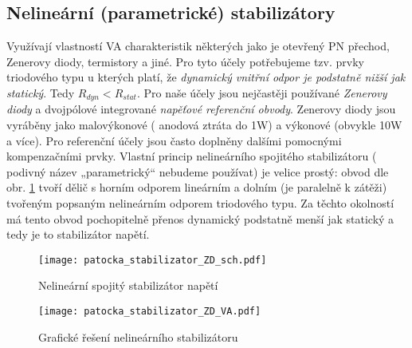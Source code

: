     \subsection{Nelineární (parametrické) stabilizátory}
      Využívají vlastností VA charakteristik některých jako je otevřený PN přechod, Zenerovy diody, termistory a jiné. Pro tyto účely potřebujeme tzv. prvky triodového typu u kterých platí, že \emph{dynamický vnitřní odpor je podstatně nižší jak statický}. Tedy $R_{dyn} < R_{stat}$. Pro naše účely jsou nejčastěji používané \emph{Zenerovy diody} a dvojpólové integrované \emph{napěťové referenční obvody}. Zenerovy diody jsou vyráběny jako malovýkonové ( anodová ztráta do 1W) a výkonové (obvykle 10W a více). Pro referenční účely jsou často doplněny dalšími pomocnými kompenzačními prvky. Vlastní princip nelineární\-ho spojitého stabilizátoru ( podivný název „parametrický“ nebudeme použí\-vat) je velice prostý: obvod dle obr. \ref{enz:fig_sch_ZD_stab} tvoří dělič s horním odporem lineárním a dolním (je paralelně k zátěži) tvořeným popsaným nelineárním odporem triodového typu. Za těchto okolností má tento obvod pochopitelně přenos dynamický podstatně menší jak statický a tedy je to stabilizátor napětí.

      \begin{figure}[ht!]
         \centering
         \texttt{[image: patocka\_stabilizator\_ZD\_sch.pdf]}
         \caption{Nelineární spojitý stabilizátor napětí}
         \label{enz:fig_sch_ZD_stab}
       \end{figure}

      \begin{figure}[ht!]
         \centering
         \texttt{[image: patocka\_stabilizator\_ZD\_VA.pdf]}
         \caption{Grafické řešení nelineárního stabilizátoru}
         \label{enz:fig_graf_res_ZD_stab}
       \end{figure}

